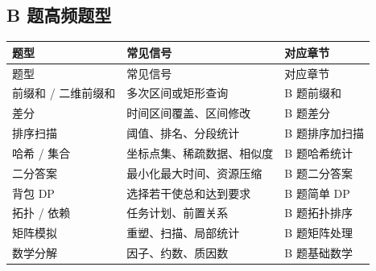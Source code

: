 \subsection{B 题高频题型}

\begin{longtable}{p{4cm}p{5cm}p{5cm}}
\toprule
题型 & 常见信号 & 对应章节 \\
\midrule
\endfirsthead
\toprule
题型 & 常见信号 & 对应章节 \\
\midrule
\endhead
前缀和 / 二维前缀和 & 多次区间或矩形查询 & B 题前缀和 \\
差分 & 时间区间覆盖、区间修改 & B 题差分 \\
排序扫描 & 阈值、排名、分段统计 & B 题排序加扫描 \\
哈希 / 集合 & 坐标点集、稀疏数据、相似度 & B 题哈希统计 \\
二分答案 & 最小化最大时间、资源压缩 & B 题二分答案 \\
背包 DP & 选择若干使总和达到要求 & B 题简单 DP \\
拓扑 / 依赖 & 任务计划、前置关系 & B 题拓扑排序 \\
矩阵模拟 & 重塑、扫描、局部统计 & B 题矩阵处理 \\
数学分解 & 因子、约数、质因数 & B 题基础数学 \\
\bottomrule
\end{longtable}
